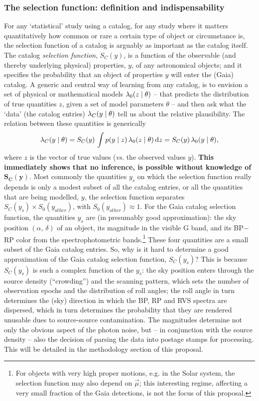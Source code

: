 \subsubsection{The selection function: definition and indispensability}

For any `statistical' study using a catalog, for any study where it matters quantitatively how common or rare a certain type of object or circumstance is, the selection function of a catalog is arguably as important as the catalog itself. The catalog \textit{selection function}, $S_C(y)$, is a function of the observable (and thereby underlying physical) properties, $y$, of any astronomical objects; and it specifies the probability that an object of properties $y$ will enter the (Gaia) catalog. A generic and central way of learning from any catalog, is to envision a set of physical or mathematical models $\lambda_0(z\mid\theta)$ -- that predicts the
distribution of true quantities $z$, given a set of model parameters $\theta$ -- and then ask
what the `data' (the catalog entries) $\lambda_C(y\mid\theta)$ tell us about the relative plausibility. 
The relation between these quantities is generically
\begin{equation}
\lambda_C(y\mid\theta) = S_C(y)\,\int p(y\mid z)\,\lambda_0(z\mid\theta)\,{\textrm{d}} z = S_C(y)\,\lambda_0(y\mid\theta),
\label{eqn:selfunc_definition}
\end{equation}
where $z$ is the vector of true values (\emph{vs.} the observed values $y$). 
\textbf{This immediately shows that no inference, is possible without knowledge of $\mathbf{S_C(y)}$}. Most commonly the quantities $y_s$ on which the selection function really depends is only a modest subset of all the catalog entries, or all the quantities that are being modelled, $y$, the selection function separates $S_C(y_s) \times S_0(y_{other})$, with $S_0(y_{other})\approx 1$. 
For the Gaia catalog selection function, the quantities $y_s$ are (in presumably good approximation): the sky position $(\alpha,\,\delta)$ of an object, its magnitude in the visible G band, and its BP$-$RP color from the spectrophotometric bands.\footnote{For objects with very high proper motions, e.g. in the Solar system, the selection function may also depend on $\vec{\mu}$; this interesting regime, affecting a very small fraction of the Gaia detections, is not the focus of this proposal.} These four quantities are a small subset of the Gaia catalog entries. So, why is it hard to determine a good approximation of the Gaia catalog selection function, $S_C(y_s)$? This is because 
$S_C(y_s)$ is such a complex function of the $y_s$: the sky position enters through the source density (``crowding'') and the scanning pattern, which sets the number of observation epochs and the distribution of roll angles; the roll angle in turn determines the (sky) direction in which the BP, RP and RVS spectra are dispersed, which in turn determines the probability that they are rendered unusable dues to source-source contamination. The magnitudes determine not only the obvious aspect of the photon noise, but -- in conjunction with the source density -- also the decision of parsing the data into postage stamps for processing. This will be detailed in the methodology section of this proposal.

